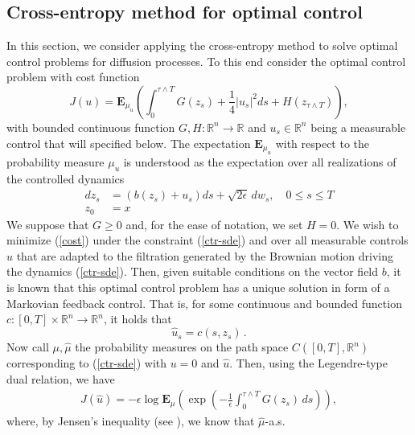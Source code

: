 \documentclass[final]{siamltex}
\newcommand{\R}{{\mathbb R}}
\newcommand{\bE}{{\mathbf E}}
\newcommand{\eps}{\epsilon}
\newcommand{\wrt}{with respect to }
\begin{document}
\subsection{Cross-entropy method for optimal control}
\label{subsec-ocp}
In this section, we consider applying the cross-entropy method to solve optimal control problems
for diffusion processes. 
%
To this end consider the optimal control problem with cost
function \cite{control_schuette,zlph2013}
\begin{equation}\label{cost}
  J(u) = \bE_{\mu_u}\left(\int_0^{\tau\wedge T} G(z_{s}) + \frac{1}{4} |u_{s}|^2
ds  + H(z_{\tau\wedge T})\right),
\end{equation}
with bounded continuous function $G,H\colon\R^{n}\to\R$ and $u_{s}\in\R^{n}$ being a measurable control that will specified below. The expectation $\bE_{\mu_u}$ \wrt the probability measure $\mu_u$ is understood as the expectation over all realizations of the controlled dynamics
\begin{equation}
 \begin{aligned}
   d z_s &= \left(b(z_s) +  u_{s}\right)ds + \sqrt{2\eps }\,dw_s, \quad 0 \le s \le T \\
    z_0&=x
  \end{aligned}
  \label{ctr-sde}
\end{equation}
We suppose that $G\ge 0$ and, for the ease of notation, we set $H=0$. We wish to minimize (\ref{cost}) under the constraint (\ref{ctr-sde}) and over all measurable controls $u$ that are adapted to the filtration generated by the Brownian motion driving the dynamics (\ref{ctr-sde}). Then, given suitable conditions on the vector field $b$, it is known that this optimal control problem has a unique solution in form of a Markovian feedback control. That is, for some continuous and bounded function $c\colon[0,T]\times \R^{n}\to\R^{n}$, it holds that 
\begin{equation}\label{feedback}
 \hat{u}_{s} = c(s, z_{s})\,.
\end{equation}
Now call $\mu, \hat{\mu}$ the probability measures on the path space  $C([0,T],\R^{n})$ corresponding to (\ref{ctr-sde}) with $u = 0$ and $\hat{u}$. Then, using the Legendre-type dual relation, we have \cite{DaiPra1996,HaEtal14} 
    \begin{align}
      J(\hat{u}) = -\eps \log \bE_\mu\left(\exp\left(-\frac{1}{\eps}\int_0^{\tau\wedge T} G(z_s) \,ds\right) \right) ,
      \label{dual-relation}
    \end{align}
    where, by Jensen's inequality (see \cite[Sec.~VI.2]{fleming2006}), we know that $\hat{\mu}$-a.s.
\end{document}
